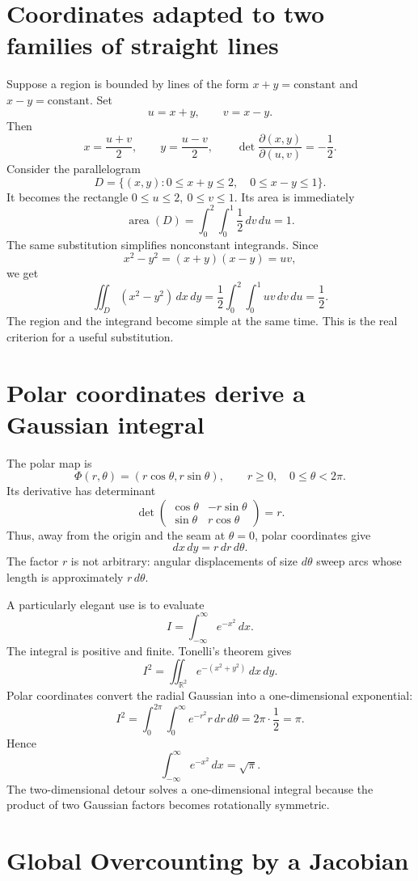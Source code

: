 \section{Coordinates adapted to two families of straight lines}

Suppose a region is bounded by lines of the form \(x+y=\text{constant}\) and \(x-y=\text{constant}\). Set
\[
 u=x+y,\qquad v=x-y.
\]
Then
\[
 x=\frac{u+v}{2},\qquad y=\frac{u-v}{2},\qquad
 \det\frac{\partial(x,y)}{\partial(u,v)}=-\frac12.
\]
Consider the parallelogram
\[
 D=\{(x,y):0\le x+y\le2,\quad0\le x-y\le1\}.
\]
It becomes the rectangle \(0\le u\le2,\ 0\le v\le1\). Its area is immediately
\[
 \operatorname{area}(D)=\int_0^2\int_0^1\frac12\,dv\,du=1.
\]
The same substitution simplifies nonconstant integrands. Since
\[
 x^2-y^2=(x+y)(x-y)=uv,
\]
we get
\[
 \boxed{\iint_D(x^2-y^2)\,dx\,dy
 =\frac12\int_0^2\int_0^1uv\,dv\,du=\frac12.}
\]
The region and the integrand become simple at the same time. This is the real criterion for a useful substitution.

\section{Polar coordinates derive a Gaussian integral}

The polar map is
\[
 \Phi(r,\theta)=(r\cos\theta,r\sin\theta),\qquad
 r\ge0,\quad0\le\theta<2\pi.
\]
Its derivative has determinant
\[
 \det\begin{pmatrix}
 \cos\theta&-r\sin\theta\\
 \sin\theta&r\cos\theta
 \end{pmatrix}=r.
\]
Thus, away from the origin and the seam at \(\theta=0\), polar coordinates give
\[
 dx\,dy=r\,dr\,d\theta.
\]
The factor \(r\) is not arbitrary: angular displacements of size \(d\theta\) sweep arcs whose length is approximately \(r\,d\theta\).

A particularly elegant use is to evaluate
\[
 I=\int_{-\infty}^{\infty}e^{-x^2}\,dx.
\]
The integral is positive and finite. Tonelli's theorem gives
\[
 I^2=\iint_{\mathbb R^2}e^{-(x^2+y^2)}\,dx\,dy.
\]
Polar coordinates convert the radial Gaussian into a one-dimensional exponential:
\[
 I^2=\int_0^{2\pi}\int_0^\infty e^{-r^2}r\,dr\,d\theta
 =2\pi\cdot\frac12=\pi.
\]
Hence
\[
 \boxed{\int_{-\infty}^{\infty}e^{-x^2}\,dx=\sqrt\pi.}
\]
The two-dimensional detour solves a one-dimensional integral because the product of two Gaussian factors becomes rotationally symmetric.

\section{Global Overcounting by a Jacobian}

